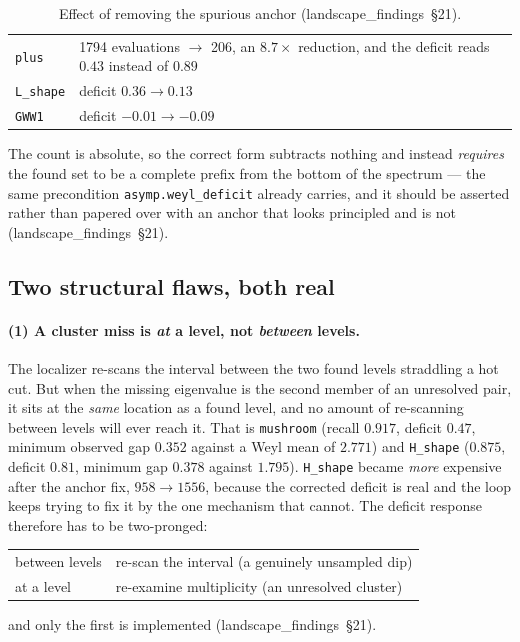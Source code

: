 \documentclass[11pt]{article}
\newcommand{\file}[1]{\texttt{#1}}
\newcommand{\lf}[1]{(landscape\_findings~\S#1)}
\begin{document}
\begin{table}[htbp]
\centering
\caption{Effect of removing the spurious anchor \lf{21}.}
\begin{tabular}{l@{\quad}p{9.2cm}}
\toprule
\file{plus}     & 1794 evaluations $\to$ 206, an $8.7\times$ reduction, and the deficit
                  reads $0.43$ instead of $0.89$ \\
\file{L\_shape} & deficit $0.36 \to 0.13$ \\
\file{GWW1}     & deficit $-0.01 \to -0.09$ \\
\bottomrule
\end{tabular}
\end{table}

The count is absolute, so the correct form subtracts nothing and instead \emph{requires} the
found set to be a complete prefix from the bottom of the spectrum --- the same precondition
\verb|asymp.weyl_deficit| already carries, and it should be asserted rather than papered over
with an anchor that looks principled and is not \lf{21}.

\subsection{Two structural flaws, both real}

\paragraph{(1) A cluster miss is \emph{at} a level, not \emph{between} levels.}
The localizer re-scans the interval between the two found levels straddling a hot cut. But when
the missing eigenvalue is the second member of an unresolved pair, it sits at the \emph{same}
location as a found level, and no amount of re-scanning between levels will ever reach it. That
is \file{mushroom} (recall $0.917$, deficit $0.47$, minimum observed gap $0.352$ against a Weyl
mean of $2.771$) and \file{H\_shape} ($0.875$, deficit $0.81$, minimum gap $0.378$ against
$1.795$). \file{H\_shape} became \emph{more} expensive after the anchor fix, $958 \to 1556$,
because the corrected deficit is real and the loop keeps trying to fix it by the one mechanism
that cannot. The deficit response therefore has to be two-pronged:
\begin{center}
\begin{tabular}{ll}
\toprule
between levels & re-scan the interval \quad(a genuinely unsampled dip) \\
at a level     & re-examine multiplicity \quad(an unresolved cluster) \\
\bottomrule
\end{tabular}
\end{center}
and only the first is implemented \lf{21}.
\end{document}
